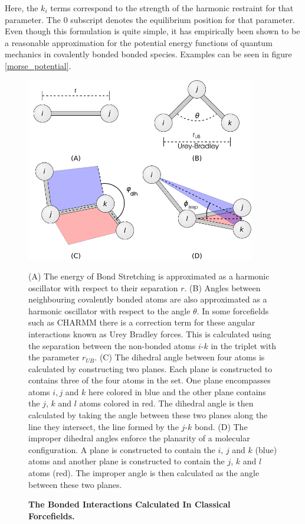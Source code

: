 Here, the $k_i$ terms correspond to the strength of the harmonic restraint for that parameter. The $0$ subscript denotes the equilibrium position for that parameter. Even though this formulation is quite simple, it has empirically been shown to be a reasonable approximation for the potential energy functions of quantum mechanics in covalently bonded bonded species. Examples can be seen in figure \ref{morse_potential}.

\begin{figure}
	\begin{center}
	\includegraphics[width=10cm]{figures/bonded_interactions.pdf}
	\end{center}
	\captionsetup{singlelinecheck = false, justification=raggedright}
	\caption[The Bonded Interactions Calculated In Classical Forcefields]{\textbf{The Bonded Interactions Calculated In Classical Forcefields.}}{
	(A) The energy of Bond Stretching is approximated as a harmonic oscillator with respect to their separation $r$. (B) Angles between neighbouring covalently bonded atoms are also approximated as a harmonic oscillator with respect to the angle $\theta$. In some forcefields such as CHARMM there is a correction term for these angular interactions known as Urey Bradley forces. This is calculated using the separation between the non-bonded atoms $i$-$k$ in the triplet with the parameter $r_{UB}$. (C) The dihedral angle between four atoms is calculated by constructing two planes. Each plane is constructed to contains three of the four atoms in the set. One plane encompasses atoms $i, j$ and $k$ here colored in blue and the other plane contains the $j$, $k$ and $l$ atoms colored in red. The dihedral angle is then calculated by taking the angle between these two planes along the line they intersect, the line formed by the $j$-$k$ bond. (D) The improper dihedral angles enforce the planarity of a molecular configuration. A plane is constructed to contain the $i$, $j$ and $k$ (blue) atoms and another plane is constructed to contain the $j$, $k$ and $l$ atoms (red). The improper angle is then calculated as the angle between these two planes. }
	\label{charmm_bonded}
\end{figure}


